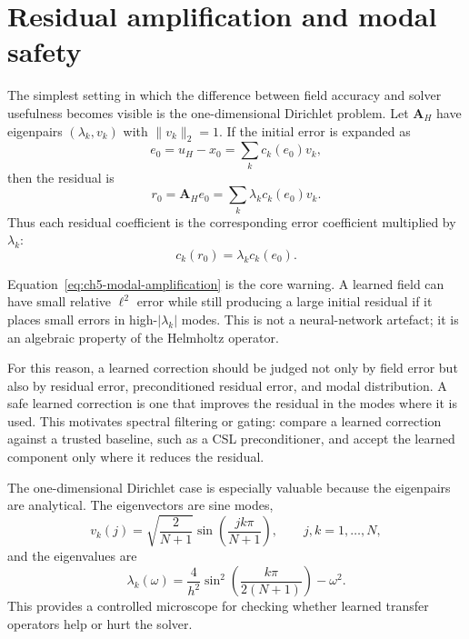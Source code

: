 \section{Residual amplification and modal safety}
\label{sec:ch5-residual-amplification}

The simplest setting in which the difference between field accuracy and solver
usefulness becomes visible is the one-dimensional Dirichlet problem. Let
$\mathbf{A}_H$ have eigenpairs $(\lambda_k,v_k)$ with
$\|v_k\|_2=1$. If the initial error is expanded as
\begin{equation}
    e_0 = u_H-x_0 = \sum_k c_k(e_0)v_k,
    \label{eq:ch5-error-expansion}
\end{equation}
then the residual is
\begin{equation}
    r_0 = \mathbf{A}_H e_0
    =
    \sum_k \lambda_k c_k(e_0)v_k.
    \label{eq:ch5-residual-expansion}
\end{equation}
Thus each residual coefficient is the corresponding error coefficient
multiplied by $\lambda_k$:
\begin{equation}
    c_k(r_0)=\lambda_k c_k(e_0).
    \label{eq:ch5-modal-amplification}
\end{equation}

Equation~\eqref{eq:ch5-modal-amplification} is the core warning. A learned
field can have small relative $\ell^2$ error while still producing a large
initial residual if it places small errors in high-$|\lambda_k|$ modes. This is
not a neural-network artefact; it is an algebraic property of the Helmholtz
operator.

For this reason, a learned correction should be judged not only by field error
but also by residual error, preconditioned residual error, and modal
distribution. A safe learned correction is one that improves the residual in
the modes where it is used. This motivates spectral filtering or gating:
compare a learned correction against a trusted baseline, such as a CSL
preconditioner, and accept the learned component only where it reduces the
residual.

The one-dimensional Dirichlet case is especially valuable because the
eigenpairs are analytical. The eigenvectors are sine modes,
\begin{equation}
    v_k(j)
    =
    \sqrt{\frac{2}{N+1}}
    \sin\!\left(\frac{jk\pi}{N+1}\right),
    \qquad
    j,k=1,\dots,N,
    \label{eq:ch5-dirichlet-eigenvectors}
\end{equation}
and the eigenvalues are
\begin{equation}
    \lambda_k(\omega)
    =
    \frac{4}{h^2}
    \sin^2\!\left(\frac{k\pi}{2(N+1)}\right)
    -
    \omega^2.
    \label{eq:ch5-dirichlet-eigenvalues}
\end{equation}
This provides a controlled microscope for checking whether learned transfer
operators help or hurt the solver.

